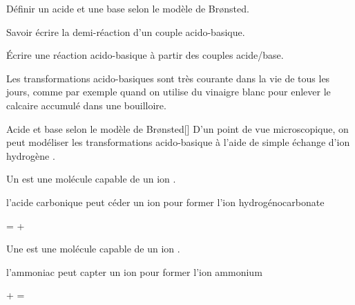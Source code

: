 \tetePremStssChim
{}

\begin{objectifs}
  \item Définir un acide et une base selon le modèle de Br\o{}nsted.
  \item Savoir écrire la demi-réaction d'un couple acido-basique.
  \item Écrire une réaction acido-basique à partir des couples acide/base.
\end{objectifs}

\begin{contexte}
  Les transformations acido-basiques sont très courante dans la vie de tous les jours, comme par exemple quand on utilise du vinaigre blanc pour enlever le calcaire accumulé dans une bouilloire.

\end{contexte}

\begin{doc}{Acide et base selon le modèle de Br\o{}nsted}[\label{doc:acide_base_bronsted}]
  D'un point de vue microscopique, on peut modéliser les transformations acido-basique à l'aide de simple échange d'ion hydrogène \ionHydrogene.

  \begin{multicols}{2}
    \begin{importants}
      Un  est une molécule capable de  un ion \ionHydrogene.
    \end{importants}
    \exemple l'acide carbonique peut céder un ion \ionHydrogene pour former l'ion hydrogénocarbonate
    \begin{center}
      \acideCarbonique =  + \ionHydrogene
    \end{center}
 
    \begin{importants}
      Une  est une molécule capable de  un ion \ionHydrogene.
    \end{importants}
    \exemple l'ammoniac peut capter un ion \ionHydrogene pour former l'ion ammonium
    \begin{center}
      \ammoniac + \ionHydrogene = \ammonium
    \end{center}
  \end{multicols}
\end{doc}

